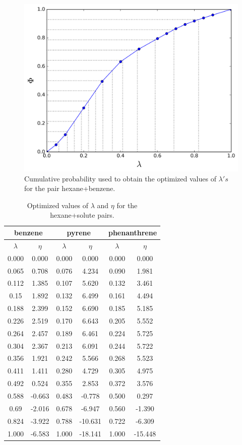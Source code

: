 \begin{figure}[h]
\centering
\includegraphics[width=0.8\linewidth]{Figures/optimized_cdf}
\caption{Cumulative probability used to obtain the optimized values of $\lambda 's$ for the pair hexane+benzene.}
\label{fig:optimized_cdf}
\end{figure}
\begin{table}[h]
	\centering
	\caption{Optimized values of $\lambda $ and $\eta $ for the hexane+solute pairs.}
	\label{tbl:lambdahex}
	\begin{tabular}{cccccc}
		\hline\hline
		\multicolumn{2}{c}{benzene}&\multicolumn{2}{c}{pyrene}& \multicolumn{2}{c}{phenanthrene}\\
		\hline\hline
		$\lambda$ & $\eta$& $\lambda$ & $\eta$  & $\lambda$ & $\eta$   \\ 
		\hline\hline
		0.000     &0.000      & 0.000	&	0.000	&	0.000	&	0.000	\\
		0.065     &0.708  & 0.076	&	4.234	&	0.090	&	1.981	\\
		0.112     &1.385  & 0.107	&	5.620	&	0.132	&	3.461	\\
		0.15      &1.892  & 0.132	&	6.499	&	0.161	&	4.494	\\
		0.188     &2.399  & 0.152	&	6.690	&	0.185	&	5.185	\\
		0.226     &2.519  & 0.170	&	6.643	&	0.205	&	5.552	\\
		0.264     &2.457  & 0.189	&	6.461	&	0.224	&	5.725	\\
		0.304     &2.367  & 0.213	&	6.091	&	0.244	&	5.722	\\
		0.356     &1.921  & 0.242	&	5.566	&	0.268	&	5.523	\\
		0.411     &1.411  & 0.280	&	4.729	&	0.305	&	4.975	\\
		0.492     &0.524  & 0.355	&	2.853	&	0.372	&	3.576	\\
		0.588     &-0.663 & 0.483	&	-0.778	&	0.500	&	0.297	\\
		0.69      &-2.016 & 0.678	&	-6.947	&	0.560	&	-1.390	\\
		0.824     &-3.922 & 0.788	&	-10.631	&	0.722	&	-6.309	\\
		1.000         &-6.583  &1.000	  &	-18.141	&	1.000	&	-15.448	\\
		\hline\hline   
	\end{tabular}
\end{table}
